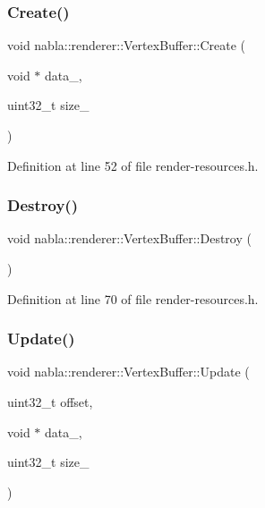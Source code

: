 \subsubsection{\texorpdfstring{Create()}{Create()}}
{\footnotesize\ttfamily void nabla\+::renderer\+::\+Vertex\+Buffer\+::\+Create (\begin{DoxyParamCaption}\item[{void $\ast$}]{data\+\_\+,  }\item[{uint32\+\_\+t}]{size\+\_\+ }\end{DoxyParamCaption})\hspace{0.3cm}{\ttfamily [inline]}}



Definition at line 52 of file render-\/resources.\+h.

\mbox{\label{structnabla_1_1renderer_1_1_vertex_buffer_a688c92818f5e914ed282b0d15cca4ca1}} 
\subsubsection{\texorpdfstring{Destroy()}{Destroy()}}
{\footnotesize\ttfamily void nabla\+::renderer\+::\+Vertex\+Buffer\+::\+Destroy (\begin{DoxyParamCaption}{ }\end{DoxyParamCaption})\hspace{0.3cm}{\ttfamily [inline]}}



Definition at line 70 of file render-\/resources.\+h.

\mbox{\label{structnabla_1_1renderer_1_1_vertex_buffer_ae62c233fb62d9e9787388dff60d65650}} 
\subsubsection{\texorpdfstring{Update()}{Update()}}
{\footnotesize\ttfamily void nabla\+::renderer\+::\+Vertex\+Buffer\+::\+Update (\begin{DoxyParamCaption}\item[{uint32\+\_\+t}]{offset,  }\item[{void $\ast$}]{data\+\_\+,  }\item[{uint32\+\_\+t}]{size\+\_\+ }\end{DoxyParamCaption})\hspace{0.3cm}{\ttfamily [inline]}}



